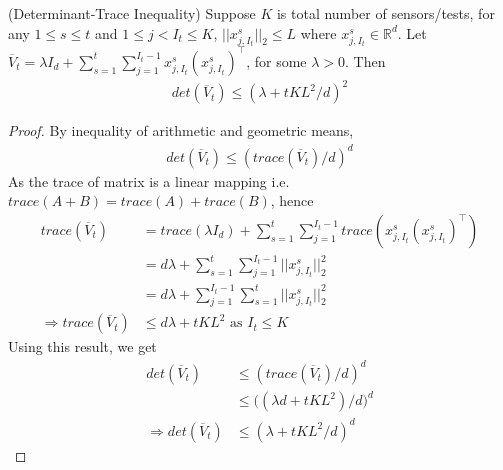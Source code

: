 \begin{lemma}
	\label{lem:det_trc}
	(Determinant-Trace Inequality) Suppose $K$ is total number of sensors/tests, for any $1 \le s \le t$ and $1 \le j < I_t \le K$, $||x_{j, I_t}^s||_2 \le L$ where $x_{j, I_t}^s \in \mathbb{R}^d$. Let $\overline{V}_t = \lambda I_d + \sum_{s=1}^{t}\sum_{j=1}^{I_t-1}x_{j, I_t}^s(x_{j, I_t}^s)^\top$, for some $\lambda > 0$. Then  
	\begin{align*}
	det(\overline{V}_t) \le (\lambda + tKL^2/d)^2
	\end{align*}
	\begin{proof} By inequality of arithmetic and geometric means,
		\begin{align*}
		det(\overline{V}_t) \le (trace(\overline{V}_t)/d)^d
		\end{align*}
		As the trace of matrix is a linear mapping i.e. $trace(A+B) = trace(A) + trace(B)$, hence
		\begin{align*}
		trace(\overline{V}_t) &= trace(\lambda I_d) + \sum_{s=1}^{t}\sum_{j=1}^{I_t-1}trace(x_{j, I_t}^s(x_{j, I_t}^s)^\top) \\
		&= d\lambda + \sum_{s=1}^{t}\sum_{j=1}^{I_t-1}||x_{j, I_t}^s||_2^2 \\
		&= d\lambda +\sum_{j=1}^{I_t-1}\sum_{s=1}^{t}||x_{j, I_t}^s||_2^2 \\
		\Rightarrow trace(\overline{V}_t) &\le d\lambda + tKL^2 \text{ as } I_t \le K
		\end{align*}
		Using this result, we get
		\begin{align*}
		det(\overline{V}_t) &\le (trace(\overline{V}_t)/d)^d \\
		&\le \big((\lambda d + tKL^2)/d\big)^d \\
		\Rightarrow det(\overline{V}_t) &\le (\lambda + tKL^2/d)^d
		\end{align*}
	\end{proof}
\end{lemma}

